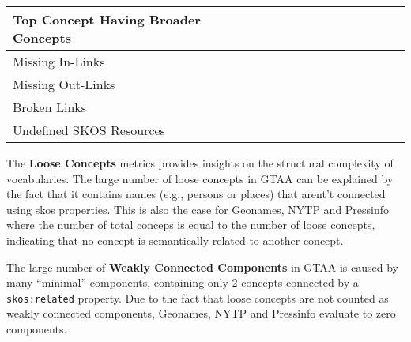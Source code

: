 \begin{table}[h]
\begin{tabular}{p{4cm}ccccccccccccccc}
Top Concept Having Broader Concepts &&&&&&&&&&&&&&& \\

\midrule

Missing In-Links &&&&&&&&&&&&&&& \\

Missing Out-Links &&&&&&&&&&&&&&& \\

Broken Links &&&&&&&&&&&&&&& \\

Undefined SKOS Resources &&&&&&&&&&&&&&& \\

\bottomrule
\end{tabular}
\end{table}

The \textbf{Loose Concepts} metrics provides insights on the structural complexity of vocabularies. The large number of loose concepts in GTAA can be explained by the fact that it contains names (e.g., persons or places) that arent't connected using skos properties. This is also the case for Geonames, NYTP and Pressinfo where the number of total conceps is equal to the number of loose concepts, indicating that no concept is semantically related to another concept.

The large number of \textbf{Weakly Connected Components} in GTAA is caused by many ``minimal'' components, containing only 2 concepts connected by a \texttt{skos:related} property. Due to the fact that loose concepts are not counted as weakly connected components, Geonames, NYTP and Pressinfo evaluate to zero components.

